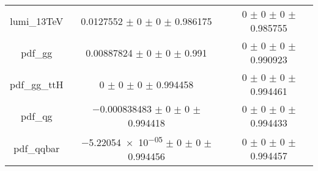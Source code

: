 \begin{table}
\begin{tabular}{ccc}
lumi\_13TeV & \num{0.0127552} $\pm$ \num{0} $\pm$ \num{0} $\pm$ \num{0.986175} & \num{0} $\pm$ \num{0} $\pm$ \num{0} $\pm$ \num{0.985755}\\
pdf\_gg & \num{0.00887824} $\pm$ \num{0} $\pm$ \num{0} $\pm$ \num{0.991} & \num{0} $\pm$ \num{0} $\pm$ \num{0} $\pm$ \num{0.990923}\\
pdf\_gg\_ttH & \num{0} $\pm$ \num{0} $\pm$ \num{0} $\pm$ \num{0.994458} & \num{0} $\pm$ \num{0} $\pm$ \num{0} $\pm$ \num{0.994461}\\
pdf\_qg & \num{-0.000838483} $\pm$ \num{0} $\pm$ \num{0} $\pm$ \num{0.994418} & \num{0} $\pm$ \num{0} $\pm$ \num{0} $\pm$ \num{0.994433}\\
pdf\_qqbar & \num{-5.22054e-05} $\pm$ \num{0} $\pm$ \num{0} $\pm$ \num{0.994456} & \num{0} $\pm$ \num{0} $\pm$ \num{0} $\pm$ \num{0.994457}\\
\bottomrule
\end{tabular}
\end{table}